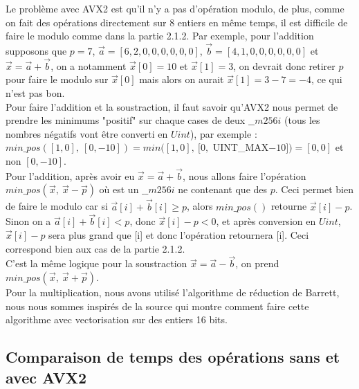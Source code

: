 \documentclass[12pt, a4paper]{article}
\begin{document}
Le problème avec AVX2 est qu'il n'y a pas d'opération modulo, de plus, comme on fait des opérations directement sur 8 entiers en même temps, il est difficile de faire le modulo comme dans la partie 2.1.2. Par exemple, pour l'addition supposons que $p = 7$, $\overrightarrow{a} = [6, 2, 0, 0, 0, 0, 0, 0]$, $\overrightarrow{b} = [4, 1, 0, 0, 0, 0, 0, 0]$ et $\overrightarrow{x} = \overrightarrow{a}+\overrightarrow{b}$, on a notamment $\overrightarrow{x}[0] = 10$ et $\overrightarrow{x}[1] = 3$, on devrait donc retirer $p$ pour faire le modulo sur $\overrightarrow{x}[0]$ mais alors on aurait $\overrightarrow{x}[1] = 3-7 = -4$, ce qui n'est pas bon.\\ 
Pour faire l'addition et la soustraction, il faut savoir qu'AVX2 nous permet de prendre les minimums "positif" sur chaque cases de deux $\_\_m256i$ (tous les nombres négatifs vont être converti en $Uint$), par exemple :\\ $min\_pos([1, 0],\  [0, -10]) = min([1, 0], \ [0,$ UINT\_MAX$-10]) = [0, 0]$ et non $[0, -10]$. \\
Pour l'addition, après avoir eu $\overrightarrow{x} = \overrightarrow{a}+\overrightarrow{b}$, nous allons faire l'opération $min\_pos(\overrightarrow{x},\ \overrightarrow{x}-\overrightarrow{p})$ où  est un $\_\_m256i$ ne contenant que des $p$. Ceci permet bien de faire le modulo car si $\overrightarrow{a}[i] + \overrightarrow{b}[i] \geq p$, alors $min\_pos()$ retourne $\overrightarrow{x}[i] - p$. Sinon on a $\overrightarrow{a}[i] + \overrightarrow{b}[i] < p$, donc $\overrightarrow{x}[i]-p < 0$, et après conversion en $Uint$, $\overrightarrow{x}[i]-p$ sera plus grand que [i] et donc l'opération retournera [i]. Ceci correspond bien aux cas de la partie 2.1.2. \\
C'est la même logique pour la soustraction $\overrightarrow{x} = \overrightarrow{a}-\overrightarrow{b}$, on prend $min\_pos(\overrightarrow{x},\ \overrightarrow{x}+\overrightarrow{p})$. \\
Pour la multiplication, nous avons utilisé l'algorithme de réduction de Barrett, nous nous sommes inspirés de la source \cite{SIMD} qui montre comment faire cette algorithme avec vectorisation sur des entiers 16 bits.

\subsection{Comparaison de temps des opérations sans et avec AVX2}
\end{document}
